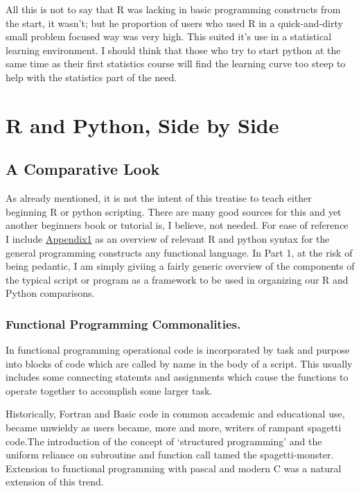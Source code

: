 \documentclass[]{book}
\theoremstyle{definition}
\theoremstyle{definition}
\theoremstyle{definition}
\theoremstyle{remark}
\begin{document}
All this is not to say that R was lacking in basic programming
constructs from the start, it wasn't; but he proportion of users who
used R in a quick-and-dirty small problem focused way was very high.
This suited it's use in a statistical learning environment. I should
think that those who try to start python at the same time as their first
statistics course will find the learning curve too steep to help with
the statistics part of the need.

\part{R and Python, Side by
Side}\label{part-r-and-python-side-by-side}

\chapter{A Comparative Look}\label{a-comparative-look}

As already mentioned, it is not the intent of this treatise to teach
either beginning R or python scripting. There are many good sources for
this and yet another beginners book or tutorial is, I believe, not
needed. For ease of reference I include
\href{https://github.com/medmatix/RtoPythonThoughts/blob/master/Appendix_1.md}{Appendix1}
as an overview of relevant R and python syntax for the general
programming constructs any functional language. In Part 1, at the risk
of being pedantic, I am simply giviing a fairly generic overview of the
components of the typical script or program as a framework to be used in
organizing our R and Python comparisons.

\section{Functional Programming
Commonalities.}\label{functional-programming-commonalities.}

In functional programming operational code is incorporated by task and
purpose into blocks of code which are called by name in the body of a
script. This usually includes some connecting statemts and assignments
which cause the functions to operate together to accomplish some larger
task.

Historically, Fortran and Basic code in common accademic and educational
use, became unwieldy as users became, more and more, writers of rampant
spagetti code.The introduction of the concept of `structured
programming' and the uniform reliance on subroutine and function call
tamed the spagetti-monster. Extension to functional programming with
pascal and modern C was a natural extension of this trend.
\end{document}
